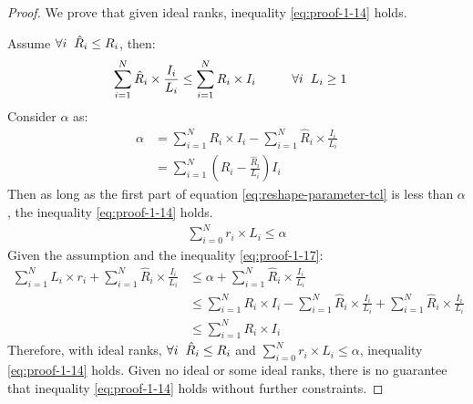 \documentclass{article}
\begin{document}
\begin{proof}
	We prove that given ideal ranks, inequality \ref{eq:proof-1-14} holds. 
	
	Assume $\forall i \hspace{2mm}\hat{R}_i \leq R_i$, then:
	\begin{align}
		\label{eq:proof-1-15}
		\sum_{i=1}^{N} \hat{R}_i \times \frac{I_i}{L_i} \leq \sum_{i=1}^{N}R_i\times I_i \hspace{10mm}&  \forall i \hspace{2mm} L_i \geq 1
	\end{align}
	Consider $\alpha$ as:
	\begin{align}
		\label{eq:proof-1-16}
		\nonumber
		\alpha &= \sum_{i=1}^{N}R_i\times I_i - \sum_{i=1}^{N} \hat{R}_i \times \frac{I_i}{L_i}
		\\
		&= \sum_{i=1}^{N} (R_i - \frac{\hat{R}_i}{L_i})I_i
	\end{align}
	Then as long as the first part of equation \ref{eq:reshape-parameter-tcl} is less than $\alpha$, the inequality \ref{eq:proof-1-14} holds.
	\begin{align}
		\label{eq:proof-1-17}
		\sum_{i=0}^{N} r_i\times L_i \leq \alpha
	\end{align}
	Given the assumption and the inequality \ref{eq:proof-1-17}:
	\begin{align}
		\label{eq:proof-1-18}
		\sum_{i=1}^{N}L_i\times r_i + \sum_{i=1}^{N} \hat{R}_i \times \frac{I_i}{L_i} &\leq
		\alpha + \sum_{i=1}^{N} \hat{R}_i \times \frac{I_i}{L_i}
		\nonumber\\
		&\leq \sum_{i=1}^{N}R_i\times I_i - \sum_{i=1}^{N} \hat{R}_i \times \frac{I_i}{L_i} + \sum_{i=1}^{N} \hat{R}_i \times \frac{I_i}{L_i}
		\nonumber\\
		&\leq \sum_{i=1}^{N}R_i\times I_i
	\end{align}
Therefore, with ideal ranks, $\forall i \hspace{2mm}\hat{R}_i \leq R_i$ and $\sum_{i=0}^{N} r_i\times L_i \leq \alpha$, inequality \ref{eq:proof-1-14} holds. Given no ideal or some ideal ranks, there is no guarantee that inequality \ref{eq:proof-1-14} holds without further constraints. 
\end{proof}
\end{document}
